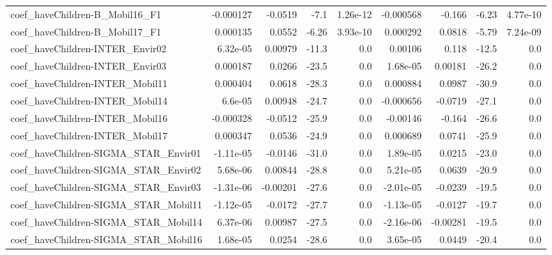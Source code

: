 \begin{tabular}{lrrrrrrrr}
coef\_haveChildren-B\_Mobil16\_F1            &   -0.000127 &      -0.0519 &    -7.1 & 1.26e-12 &  -0.000568 &      -0.166 &        -6.23 &      4.77e-10 \\
coef\_haveChildren-B\_Mobil17\_F1            &    0.000135 &       0.0552 &   -6.26 & 3.93e-10 &   0.000292 &      0.0818 &        -5.79 &      7.24e-09 \\
coef\_haveChildren-INTER\_Envir02           &    6.32e-05 &      0.00979 &   -11.3 &      0.0 &    0.00106 &       0.118 &        -12.5 &           0.0 \\
coef\_haveChildren-INTER\_Envir03           &    0.000187 &       0.0266 &   -23.5 &      0.0 &   1.68e-05 &     0.00181 &        -26.2 &           0.0 \\
coef\_haveChildren-INTER\_Mobil11           &    0.000404 &       0.0618 &   -28.3 &      0.0 &   0.000884 &      0.0987 &        -30.9 &           0.0 \\
coef\_haveChildren-INTER\_Mobil14           &     6.6e-05 &      0.00948 &   -24.7 &      0.0 &  -0.000656 &     -0.0719 &        -27.1 &           0.0 \\
coef\_haveChildren-INTER\_Mobil16           &   -0.000328 &      -0.0512 &   -25.9 &      0.0 &   -0.00146 &      -0.164 &        -26.6 &           0.0 \\
coef\_haveChildren-INTER\_Mobil17           &    0.000347 &       0.0536 &   -24.9 &      0.0 &   0.000689 &      0.0741 &        -25.9 &           0.0 \\
coef\_haveChildren-SIGMA\_STAR\_Envir01      &   -1.11e-05 &      -0.0146 &   -31.0 &      0.0 &   1.89e-05 &      0.0215 &        -23.0 &           0.0 \\
coef\_haveChildren-SIGMA\_STAR\_Envir02      &    5.68e-06 &      0.00844 &   -28.8 &      0.0 &   5.21e-05 &      0.0639 &        -20.9 &           0.0 \\
coef\_haveChildren-SIGMA\_STAR\_Envir03      &   -1.31e-06 &     -0.00201 &   -27.6 &      0.0 &  -2.01e-05 &     -0.0239 &        -19.5 &           0.0 \\
coef\_haveChildren-SIGMA\_STAR\_Mobil11      &   -1.12e-05 &      -0.0172 &   -27.7 &      0.0 &  -1.13e-05 &     -0.0127 &        -19.7 &           0.0 \\
coef\_haveChildren-SIGMA\_STAR\_Mobil14      &    6.37e-06 &      0.00987 &   -27.5 &      0.0 &  -2.16e-06 &    -0.00281 &        -19.5 &           0.0 \\
coef\_haveChildren-SIGMA\_STAR\_Mobil16      &    1.68e-05 &       0.0254 &   -28.6 &      0.0 &   3.65e-05 &      0.0449 &        -20.4 &           0.0 \\

\end{tabular}
